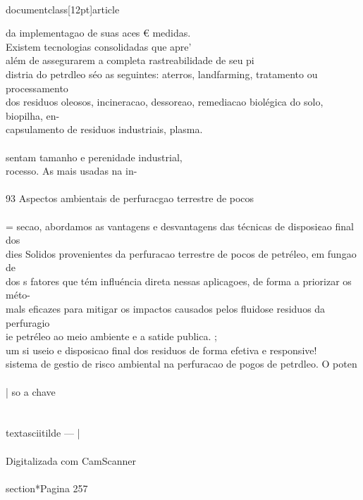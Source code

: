 \\documentclass[12pt]{article}
\begin{document}
da implementagao de suas aces € medidas.\\
Existem tecnologias consolidadas que apre'\\
além de assegurarem a completa rastreabilidade de seu pi\\
distria do petrdleo séo as seguintes: aterros, landfarming, tratamento ou processamento\\
dos residuos oleosos, incineracao, dessor¢ao, remediacao biolégica do solo, biopilha, en-\\
capsulamento de residuos industriais, plasma.\\
\\
sentam tamanho e perenidade industrial,\\
rocesso. As mais usadas na in-\\
\\
93 Aspectos ambientais de perfuracgao terrestre de pocos\\
\\
= secao, abordamos as vantagens e desvantagens das técnicas de disposi¢ao final dos\\
dies Solidos provenientes da perfuracao terrestre de pocos de petréleo, em fungao de\\
dos s fatores que tém influéncia direta nessas aplicagoes, de forma a priorizar os méto-\\
mals eficazes para mitigar os impactos causados pelos fluidose residuos da perfuragio\\
ie petréleo ao meio ambiente e a satide publica. ;\\
um si useio e disposicao final dos residuos de forma efetiva e responsive!\\
sistema de gestio de risco ambiental na perfuracao de pogos de petrdleo. O poten\\
\\
| so a chave\\
\\
\\textasciitilde{} — |\\
\\
Digitalizada com CamScanner\\

\\section*{Pagina 257}
\end{document}
